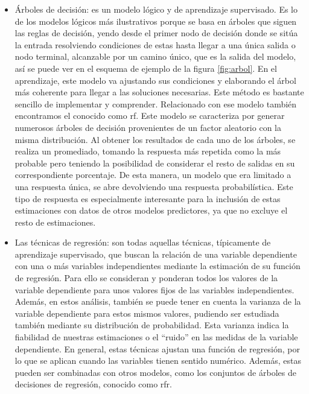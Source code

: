 \begin{itemize}
	\item Árboles de decisión: es un modelo lógico y de aprendizaje supervisado. Es lo de los modelos lógicos más ilustrativos porque se basa en árboles que siguen las reglas de decisión, yendo desde el primer nodo de decisión donde se sitúa la entrada resolviendo condiciones de estas hasta llegar a una única salida o nodo terminal, alcanzable por un camino único, que es la salida del modelo, así se puede ver en el esquema de ejemplo de la figura \ref{fig:arbol}. En el aprendizaje, este modelo va ajustando sus condiciones y elaborando el árbol más coherente para llegar a las soluciones necesarias. Este método es bastante sencillo de implementar y comprender. Relacionado con ese modelo también encontramos el conocido como \gls{rf}. Este modelo se caracteriza por generar numerosos árboles de decisión provenientes de un factor aleatorio con la misma distribución. Al obtener los resultados de cada uno de los árboles, se realiza un promediado, tomando la respuesta más repetida como la más probable pero teniendo la posibilidad de considerar el resto de salidas en su correspondiente porcentaje. De esta manera, un modelo que era limitado a una respuesta única, se abre devolviendo una respuesta probabilística. Este tipo de respuesta es especialmente interesante para la inclusión de estas estimaciones con datos de otros modelos predictores, ya que no excluye el resto de estimaciones. 
	\item Las técnicas de regresión: son todas aquellas técnicas, típicamente de aprendizaje supervisado, que buscan la relación de una variable dependiente con una o más variables independientes mediante la estimación de su función de regresión. Para ello se consideran y ponderan todos los valores de la variable dependiente para unos valores fijos de las variables independientes. Además, en estos análisis, también se puede tener en cuenta la varianza de la variable dependiente para estos mismos valores, pudiendo ser estudiada también mediante su distribución de probabilidad. Esta varianza indica la fiabilidad de nuestras estimaciones o el ``ruido'' en las medidas de la variable dependiente. En general, estas técnicas ajustan una función de regresión, por lo que se aplican cuando las variables tienen sentido numérico. Además, estas pueden ser combinadas con otros modelos, como los conjuntos de árboles de decisiones de regresión, conocido como \gls{rfr}.
\end{itemize}

